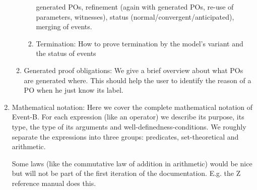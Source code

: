 \begin{enumerate}
\begin{enumerate}
\begin{enumerate}
      generated POs, refinement (again with generated POs, re-use of parameters, witnesses),
      status (normal/convergent/anticipated), merging of events.
    \item Termination: How to prove termination by the model's variant and the status of events
    \end{enumerate}
  \item Generated proof obligations: We give a brief overview about what POs are generated
    where. This should help the user to identify the reason of a PO when he just know its label.
  \end{enumerate}
\item Mathematical notation:
  Here we cover the complete mathematical notation of Event-B. For each expression
  (like an operator) we describe its purpose, its type, the type of its arguments and
  well-definedness-conditions. 
  We roughly separate the expressions into three groups: predicates, set-theoretical and arithmetic.

  Some laws (like the commutative law of addition in arithmetic) would be nice but will not be part of the first
  iteration of the documentation. E.g. the Z reference manual does this.


\end{enumerate}
